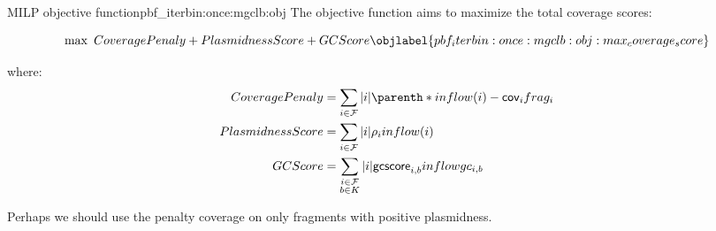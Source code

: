 \begin{definition}{\MGCLB{} MILP objective function}{pbf_iterbin:once:mgclb:obj}
  The objective function aims to maximize the total coverage scores:
  \begin{Objective}
    \begin{equation}
      \max ~ CoveragePenaly + PlasmidnessScore + GCScore
      \objlabel{pbf_iterbin:once:mgclb:obj:max_coverage_score} %
    \end{equation}
  \end{Objective}
  where:
  \begin{align*}
    CoveragePenaly &= %
    \sum_{i \in \Fragments{}} |i| \parenth*{ inflow(i) - \cov{i}\frag{i} } \\
    PlasmidnessScore &= %
    \sum_{i \in \Fragments{}} |i| \plm{i} inflow(i) \\
    GCScore &= %
    \sum_{\substack{
        i \in \Fragments{} \\
        b \in K
    }} |i| \gcscore{i}{b} \inflowgc{i}{b}
  \end{align*}

  \begin{ideabox}
    Perhaps we should use the penalty coverage on only fragments with positive plasmidness.
  \end{ideabox}
\end{definition}